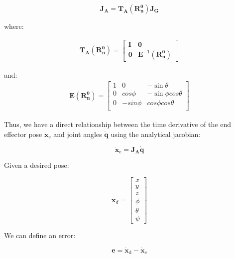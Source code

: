 \documentclass{UoNMCHA}
\numberwithin{equation}{section}
\begin{document}
\begin{equation*}
\mathbf{J_A} = \mathbf{T_A (R^0_n)J_G} 
\end{equation*}

where:

\begin{equation}
	\begin{aligned}
		\mathbf{T_A (R^0_n)} =
		\begin{bmatrix}
		\mathbf{I} & \mathbf{0} \\
		\mathbf{0} & \mathbf{E^{-1}(R^0_n)} 
		\end{bmatrix} 
	\end{aligned}
\end{equation}

and:
\begin{equation}
	\begin{aligned}
		\mathbf{E (R^0_n)} =
		\begin{bmatrix}
		1 & 0 & -\sin\theta\\
		0 & cos\phi & -\sin\phi cos\theta\\
		0 & -sin\phi & cos\phi cos\theta\\
		\end{bmatrix}
	\end{aligned}
\end{equation}

Thus, we have a direct relationship between the time derivative of the end effector pose $\mathrm{ \dot{\mathbf{x}}_e }$ and joint angles $\dot{\mathbf{q}}$ using the analytical jacobian:

\begin{equation} \label{eqn:AnalyticalJacobian}
	\mathrm{ \mathbf{\dot{x}}_e } = \mathbf{J_A \dot{q}}
\end{equation}

Given a desired pose:

\begin{equation}
\mathrm{\mathbf{x}}_d = 
\begin{bmatrix}
x \\ y \\ z \\ \phi \\ \theta \\ \psi
\end{bmatrix}
\end{equation} 

We can define an error:

\begin{equation*}
\mathbf{e} = \mathrm{ \mathbf{\dot{x}}_d } - \mathrm{ \mathbf{\dot{x}}_e }
\end{equation*}\
\end{document}
